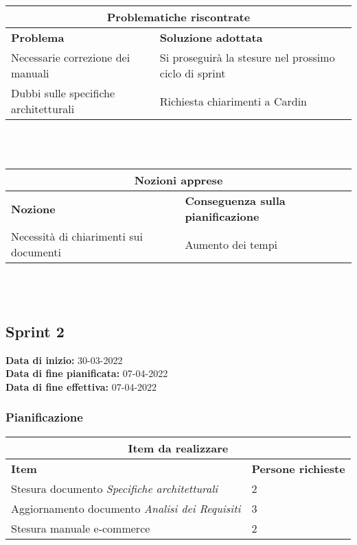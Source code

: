 \documentclass[a4paper, 12pt]{article}
\begin{document}
\begin{center}
    \begin{tabularx}{\textwidth}{|X|X|}
        \hline
        \multicolumn{2}{|c|}{\textbf{Problematiche riscontrate}}\\
        \hline
        \hline
        \textbf{Problema} & \textbf{Soluzione adottata}\\
        \hline
        Necessarie correzione dei manuali & Si proseguirà la stesure nel prossimo ciclo di sprint\\
        \hline
        Dubbi sulle specifiche architetturali & Richiesta chiarimenti a Cardin\\
        \hline
    \end{tabularx}\\[8pt]
    \mbox{}\\
\end{center}

\begin{center}
    \begin{tabularx}{\textwidth}{|X|X|}
        \hline
        \multicolumn{2}{|c|}{\textbf{Nozioni apprese}}\\
        \hline
        \hline
        \textbf{Nozione} & \textbf{Conseguenza sulla pianificazione}\\
        \hline
        Necessità di chiarimenti sui documenti & Aumento dei tempi\\
        \hline
    \end{tabularx}\\[8pt]
    \mbox{}\\
\end{center}

\subsection{Sprint 2}
\textbf{Data di inizio:} 30-03-2022\\
\textbf{Data di fine pianificata:} 07-04-2022\\
\textbf{Data di fine effettiva:} 07-04-2022

\subsubsection{Pianificazione}\mbox{}

\begin{center}
    \begin{tabularx}{\textwidth}{|X|X|}
        \hline
        \multicolumn{2}{|c|}{\textbf{Item da realizzare}}\\
        \hline
        \hline
        \textbf{Item} & \textbf{Persone richieste}\\
        \hline
        Stesura documento \textit{Specifiche architetturali} & 2\\
        \hline
        Aggiornamento documento \textit{Analisi dei Requisiti} & 3\\
        \hline
        Stesura manuale e-commerce & 2\\
        \hline
    \end{tabularx}\\[8pt]
    \mbox{}\\
\end{center}
\end{document}
